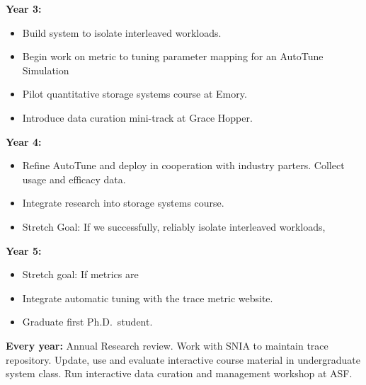 \noindent
\textbf{Year 3:}
\begin{itemize}
\item Build system to isolate interleaved workloads.

\item Begin work on metric to tuning parameter mapping for an AutoTune
Simulation 
\item Pilot quantitative storage systems course at Emory.
\item Introduce data curation mini-track at Grace Hopper.
%
\end{itemize}
\noindent
\textbf{Year 4:} 
%
\begin{itemize}
\item Refine AutoTune and deploy in cooperation with industry parters.  Collect usage and efficacy data.
\item Integrate research into storage systems course. 
\item Stretch Goal: If we successfully, reliably isolate interleaved workloads, 
\end{itemize}
\noindent
\textbf{Year 5:} 
\begin{itemize}
\item Stretch goal: If metrics are 
\item Integrate automatic tuning with the trace metric website.
\item Graduate first Ph.D.~student.
\end{itemize}

\noindent
\textbf{Every year:} Annual Research review.  Work with SNIA to maintain trace
repository.
Update, use and evaluate interactive course material in undergraduate system
class.  Run interactive data curation and management workshop at ASF. %


